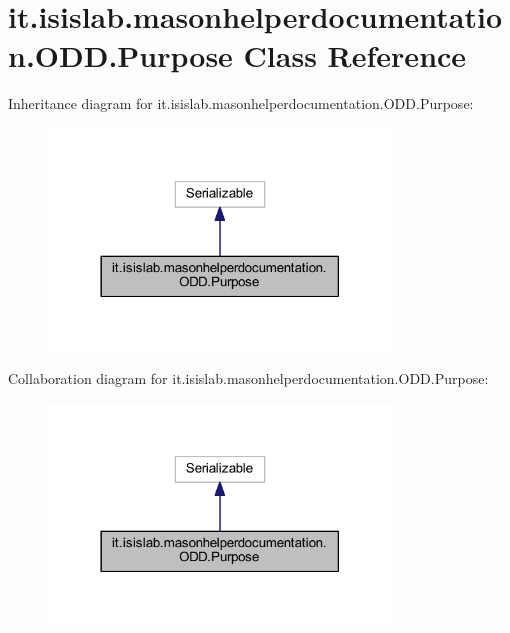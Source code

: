 \hypertarget{classit_1_1isislab_1_1masonhelperdocumentation_1_1_o_d_d_1_1_purpose}{\section{it.\-isislab.\-masonhelperdocumentation.\-O\-D\-D.\-Purpose Class Reference}
\label{classit_1_1isislab_1_1masonhelperdocumentation_1_1_o_d_d_1_1_purpose}
}


Inheritance diagram for it.\-isislab.\-masonhelperdocumentation.\-O\-D\-D.\-Purpose\-:
\nopagebreak
\begin{figure}[H]
\begin{center}
\leavevmode
\includegraphics[width=258pt]{classit_1_1isislab_1_1masonhelperdocumentation_1_1_o_d_d_1_1_purpose__inherit__graph}
\end{center}
\end{figure}


Collaboration diagram for it.\-isislab.\-masonhelperdocumentation.\-O\-D\-D.\-Purpose\-:
\nopagebreak
\begin{figure}[H]
\begin{center}
\leavevmode
\includegraphics[width=258pt]{classit_1_1isislab_1_1masonhelperdocumentation_1_1_o_d_d_1_1_purpose__coll__graph}
\end{center}
\end{figure}
